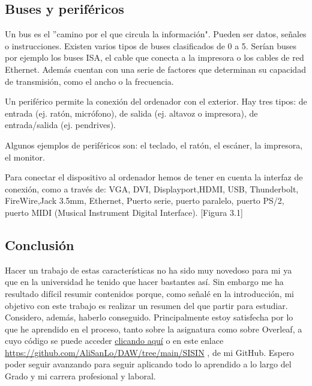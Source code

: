 \documentclass{book}
\begin{document}
\subsection{\textbf{Buses y periféricos}}
\begin{large}
Un bus es el ''camino por el que circula la información". Pueden ser datos, señales o instrucciones. Existen varios tipos de buses clasificados de 0 a 5. Serían buses por ejemplo los buses ISA, el cable que conecta a la impresora o los cables de red Ethernet. Además cuentan con una serie de factores que determinan su capacidad de transmisión, como el ancho o la frecuencia.

Un periférico permite la conexión del ordenador con el exterior. Hay tres tipos: de entrada (ej. ratón, micrófono), de salida (ej. altavoz o impresora), de entrada/salida (ej. pendrives).

Algunos ejemplos de periféricos son: el teclado, el ratón, el escáner, la impresora, el monitor.

Para conectar el dispositivo al ordenador hemos de tener en cuenta la interfaz de conexión, como a través de: VGA, DVI, Displayport,HDMI, USB, Thunderbolt, FireWire,Jack 3.5mm, Ethernet, Puerto serie, puerto paralelo, puerto PS/2, puerto MIDI (Musical Instrument Digital Interface). [Figura 3.1]

\end{large}

\subsection{\textbf{Conclusión}}

\begin{large}

Hacer un trabajo de estas características no ha sido muy novedoso para mi ya que en la universidad he tenido que hacer bastantes así. Sin embargo me ha resultado difícil resumir contenidos porque, como señalé en la introducción, mi objetivo con este trabajo es realizar un resumen del que partir para estudiar. Considero, además, haberlo conseguido. Principalmente estoy satisfecha por lo que he aprendido en el proceso, tanto sobre la asignatura como sobre Overleaf, a cuyo código se puede acceder  \href{https://github.com/AliSanLo/DAW/tree/main/SISIN}{clicando aquí} o en este enlace \url {https://github.com/AliSanLo/DAW/tree/main/SISIN} , de mi GitHub. Espero poder seguir avanzando para seguir aplicando todo lo aprendido a lo largo del Grado y mi carrera profesional y laboral. 



\end{large}
\end{document}
